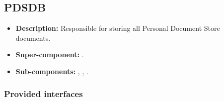 \subsection{PDSDB}
\begin{itemize}
    \item \textbf{Description:} Responsible for storing all Personal Document Store documents.
    \item \textbf{Super-component:} .
    \item \textbf{Sub-components:} , , .
\end{itemize}

\subsubsection*{Provided interfaces}
